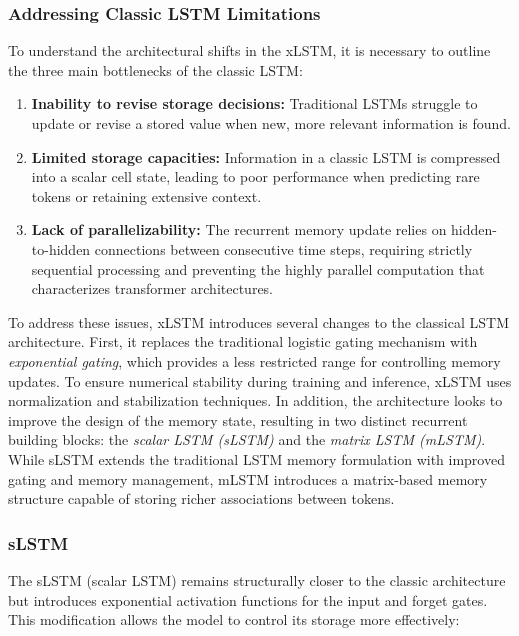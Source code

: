 \subsubsection{Addressing Classic LSTM Limitations}
To understand the architectural shifts in the xLSTM, it is necessary to outline the 
three main bottlenecks of the classic LSTM:
\begin{enumerate}
    \item \textbf{Inability to revise storage decisions:} Traditional LSTMs struggle to
    update or revise a stored value when new, more relevant information is found. 
    \item \textbf{Limited storage capacities:} Information in a classic LSTM is compressed 
    into a scalar cell state, leading to poor performance when predicting rare tokens or 
    retaining extensive context.
    \item \textbf{Lack of parallelizability:} The recurrent memory update relies on hidden-to-hidden 
    connections between consecutive time steps, requiring strictly sequential processing and 
    preventing the highly parallel computation that characterizes transformer architectures.
\end{enumerate}

\noindent To address these issues, xLSTM introduces several changes to the classical LSTM architecture.
First, it replaces the traditional logistic gating mechanism with \textit{exponential gating}, 
which provides a less restricted range for controlling memory updates. To ensure numerical stability 
during training and inference, xLSTM uses normalization and 
stabilization techniques. In addition, the architecture looks to improve the design of the memory state, 
resulting in two distinct recurrent building blocks: the \textit{scalar LSTM (sLSTM)} and the 
\textit{matrix LSTM (mLSTM)}. While sLSTM extends the traditional LSTM memory formulation with 
improved gating and memory management, mLSTM introduces a matrix-based memory structure capable of 
storing richer associations between tokens.

\subsubsection{sLSTM}
The sLSTM (scalar LSTM) remains structurally closer to the classic architecture but 
introduces exponential activation functions for the input and forget gates. 
This modification allows the model to control its storage more effectively:

